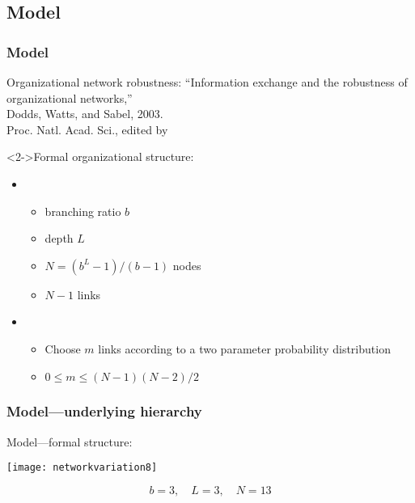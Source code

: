 
\subsection{Model}

\begin{frame}
  \frametitle{Model}

  \begin{block}{Organizational network robustness:}
    ``Information exchange and the robustness of organizational networks,''\\
    Dodds, Watts, and Sabel, 2003.\cite{dodds2003c}\\
    Proc. Natl. Acad. Sci., edited by 
  \end{block}

  \begin{block}<2->{Formal organizational structure:}
    \begin{itemize}
    \item<2->
      \begin{itemize}
      \item
        branching ratio $b$
      \item
        depth $L$
      \item
        $N = (b^L-1)/(b-1)$ nodes
      \item
        $N-1$ links
      \end{itemize}
    \item<3->
      \begin{itemize}
      \item 
        Choose $m$ links according to a
        two parameter probability distribution
      \item 
        $ 0 \le m \le (N-1)(N-2)/2 $
      \end{itemize}
    \end{itemize}
    
  \end{block}



\end{frame}


\begin{frame}
  \frametitle{Model---underlying hierarchy}

  \begin{block}{Model---formal structure:}
    \begin{center}
      \texttt{[image: networkvariation8]}
    \end{center}
    $$ 
    b=3, \quad  L=3, \quad N=13
    $$
  \end{block}

\end{frame}


